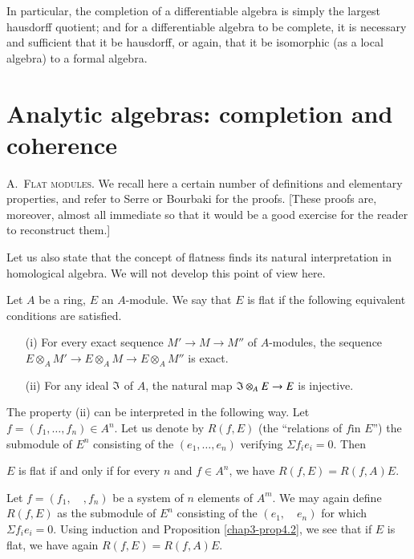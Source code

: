 In particular, the completion of a differentiable algebra is simply the largest hausdorff quotient; and for a differentiable algebra to be complete, it is necessary and sufficient that it be hausdorff, or again, that it be isomorphic (as a local algebra) to a formal algebra.

\section{Analytic algebras: completion and coherence}\label{chap3-sec4}

A.~\textsc{Flat modules.} We recall here a certain number of definitions and elementary properties, and refer to Serre \cite{J. P. Serre : 1} or Bourbaki \cite{N. Bourbaki: 1} for the proofs. [These proofs are, moreover, almost all immediate so that it would be a good exercise for the reader to reconstruct them.]

Let us also state that the concept of flatness finds its natural interpretation in homological algebra. We will not develop this point of view here.

\begin{definition}\label{chap3-defi4.1}
Let $A$ be a ring, $E$ an $A$-module. We say that $E$ is flat if the following equivalent conditions are satisfied.
\begin{itemize}
\item[\rm(i)] For every exact sequence $M'\to M\to M''$ of $A$-modules, the sequence $E\otimes_{A}M'\to E\otimes_{A}M\to E\otimes_{A}M''$ is exact.

\item[\rm(ii)] For any ideal $\mathfrak{I}$ of $A$, the natural map $\mathfrak{I}\otimes_{A}E\to E$ is injective.
\end{itemize}
\end{definition}

The property (ii) can be interpreted in the following way. Let $f=(f_{1},\ldots,f_{n})\in A^{n}$. Let us denote by $R(f,E)$ (the ``relations of $f$\pageoriginale in $E$'') the submodule of $E^{n}$ consisting of the $(e_{1},\ldots,e_{n})$ verifying $\Sigma f_{i}e_{i}=0$. Then

\begin{proposition}\label{chap3-prop4.2}
$E$ is flat if and only if for every $n$ and $f\in A^{n}$, we have $R(f,E)=R(f,A)E$.
\end{proposition}

\begin{remark}\label{chap3-rem4.3}
Let $f=(f_{1},\quad,f_{n})$ be a system of $n$ elements of $A^{m}$. We may again define $R(f,E)$ as the submodule of $E^{n}$ consisting of the $(e_{1},\quad e_{n})$ for which $\Sigma f_{i}e_{i}=0$. Using induction and Proposition \ref{chap3-prop4.2}, we see that if $E$ is flat, we have again $R(f,E)=R(f,A)E$.
\end{remark}


